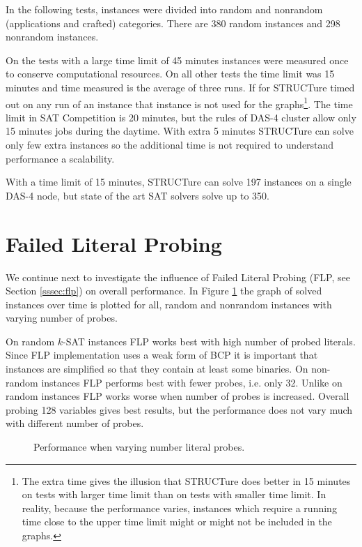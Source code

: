 In the following tests, instances were divided into random and
nonrandom (applications and crafted) categories. There are 380 random
instances and 298 nonrandom instances.

On the tests with a large time limit of 45 minutes instances were
measured once to conserve computational resources. On all other tests
the time limit was 15 minutes and time measured is the average of
three runs.  If for STRUCTure timed out on any run of an instance
that instance is not used for the graphs\footnote{The extra
time gives the illusion that STRUCTure does better in 15 minutes on
tests with larger time limit than on tests with smaller time limit.
In reality, because the performance varies, instances which require
a running time close to the upper time limit might or might not
be included in the graphs.}. The time limit in SAT Competition is
20 minutes, but the rules of DAS-4 cluster allow only 15
minutes jobs during the daytime.  With extra 5 minutes STRUCTure
can solve only few extra instances so the additional time is not
required to understand performance a scalability.

With a time limit of 15 minutes, STRUCTure can solve 197 instances
on a single DAS-4 node, but state of the art SAT solvers solve up
to 350.


\section{Failed Literal Probing}

We continue next to investigate the influence of Failed
Literal Probing (FLP, see Section \ref{sssec:flp}) on overall
performance. In Figure \ref{fig:flp} the graph of solved instances
over time is plotted for all, random and nonrandom instances with
varying number of probes.

On random $k$-SAT instances FLP works best with high number of
probed literals. Since FLP implementation uses a weak form of BCP
it is important that instances are simplified so that they contain
at least some binaries.  On non-random instances FLP performs best
with fewer probes, i.e. only 32.  Unlike on random instances FLP
works worse when number of probes is increased.  Overall probing
128 variables gives best results, but the performance does not vary
much with different number of probes.

\begin{figure}
  \centering
  \caption{Performance when varying number literal probes.}
  \label{fig:flp}
\end{figure}


